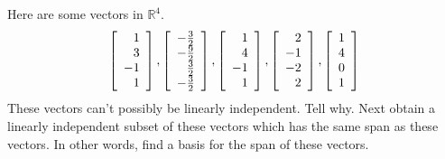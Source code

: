 \begin{enumialphparenastyle}
\begin{ex} Here are some vectors in $\mathbb{R}^{4}$. 
\begin{equation*}
\left[ 
\begin{array}{r}
1 \\ 
3 \\ 
-1 \\ 
1
\end{array}
\right] ,\left[ 
\begin{array}{r}
-\frac{3}{2} \\ 
-\frac{9}{2} \\ 
\frac{3}{2} \\ 
-\frac{3}{2}
\end{array}
\right] ,\left[ 
\begin{array}{r}
1 \\ 
4 \\ 
-1 \\ 
1
\end{array}
\right] ,\left[ 
\begin{array}{r}
2 \\ 
-1 \\ 
-2 \\ 
2
\end{array}
\right] ,\left[ 
\begin{array}{r}
1 \\ 
4 \\ 
0 \\ 
1
\end{array}
\right]
\end{equation*}
These vectors can't possibly be linearly independent. Tell why. Next obtain a
linearly independent subset of these vectors which has the same span as
these vectors. In other words, find a basis for the span of these vectors.
\end{ex}



\end{enumialphparenastyle}
